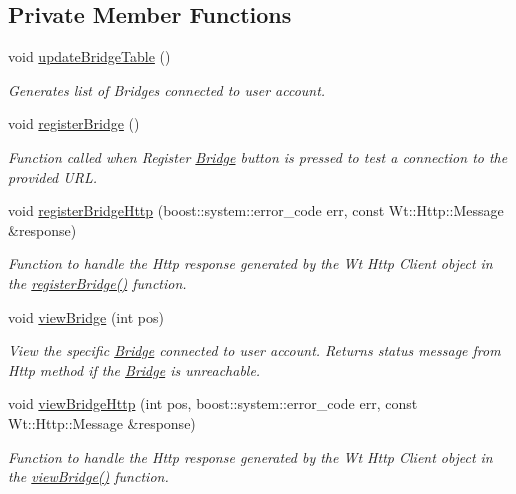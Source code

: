 \subsection*{Private Member Functions}
\begin{DoxyCompactItemize}
\item 
void \hyperlink{classBridgeScreenWidget_a7258758ac7316e501053374af067df14}{update\+Bridge\+Table} ()
\begin{DoxyCompactList}\small\item\em Generates list of Bridges connected to user account. \end{DoxyCompactList}\item 
void \hyperlink{classBridgeScreenWidget_af1e58db73b4940c156274e748e39b8d8}{register\+Bridge} ()
\begin{DoxyCompactList}\small\item\em Function called when Register \hyperlink{classBridge}{Bridge} button is pressed to test a connection to the provided U\+RL. \end{DoxyCompactList}\item 
void \hyperlink{classBridgeScreenWidget_ab146eb3da0d286a3a697fa6ce7147a28}{register\+Bridge\+Http} (boost\+::system\+::error\+\_\+code err, const Wt\+::\+Http\+::\+Message \&response)
\begin{DoxyCompactList}\small\item\em Function to handle the Http response generated by the Wt Http Client object in the \hyperlink{classBridgeScreenWidget_af1e58db73b4940c156274e748e39b8d8}{register\+Bridge()} function. \end{DoxyCompactList}\item 
void \hyperlink{classBridgeScreenWidget_af1bbb293408fa78fb5812e079cb1ee69}{view\+Bridge} (int pos)
\begin{DoxyCompactList}\small\item\em View the specific \hyperlink{classBridge}{Bridge} connected to user account. Returns status message from Http method if the \hyperlink{classBridge}{Bridge} is unreachable. \end{DoxyCompactList}\item 
void \hyperlink{classBridgeScreenWidget_a6a21f3a059a4675d353f3d25cca72562}{view\+Bridge\+Http} (int pos, boost\+::system\+::error\+\_\+code err, const Wt\+::\+Http\+::\+Message \&response)
\begin{DoxyCompactList}\small\item\em Function to handle the Http response generated by the Wt Http Client object in the \hyperlink{classBridgeScreenWidget_af1bbb293408fa78fb5812e079cb1ee69}{view\+Bridge()} function. \end{DoxyCompactList}\item 

\end{DoxyCompactItemize}
